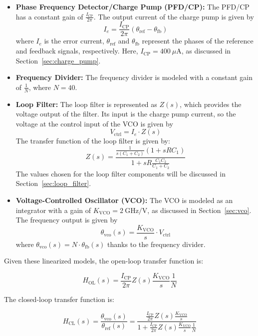 \documentclass[lettersize,journal]{IEEEtran}
\begin{document}
\begin{itemize}
    \item \textbf{Phase Frequency Detector/Charge Pump (PFD/CP):} The PFD/CP has a constant gain of \( \frac{I_{\text{CP}}}{2\pi} \). The output current of the charge pump is given by 
    \[ 
    I_e = \frac{I_{\text{CP}}}{2\pi} \left( \theta_{\text{ref}} - \theta_{\text{fb}} \right)
    \] 
    where \(I_e\) is the error current, \( \theta_{\text{ref}} \) and \( \theta_{\text{fb}} \) represent the phases of the reference and feedback signals, respectively. Here, \( I_{\text{CP}} = 400~\mu\mathrm{A} \), as discussed in Section~\ref{sec:charge_pump}.
    
    \item \textbf{Frequency Divider:} The frequency divider is modeled with a constant gain of \( \frac{1}{N} \), where \( N = 40 \).
    
    \item \textbf{Loop Filter:} The loop filter is represented as \( Z(s) \), which provides the voltage output of the filter. Its input is the charge pump current, so the voltage at the control input of the VCO is given by 
    \[ 
    V_{\text{ctrl}} = I_e \cdot Z(s) 
    \] 
    The transfer function of the loop filter is given by:
    \[
    Z(s) = \frac{\frac{1}{s(C_1 + C_2)} \left(1 + sRC_1\right)}{1 + sR\frac{C_1C_2}{C_1 + C_2}}
    \]
    The values chosen for the loop filter components will be discussed in Section~\ref{sec:loop_filter}.
    
    \item \textbf{Voltage-Controlled Oscillator (VCO):} The VCO is modeled as an integrator with a gain of \( K_{\text{VCO}} = 2~\mathrm{GHz/V} \), as discussed in Section~\ref{sec:vco}. The frequency output is given by 
    \[ 
    \theta_{\text{vco}}(s) = \frac{K_{\text{VCO}}}{s} \cdot V_{\text{ctrl}} 
    \]
    where \(\theta_{\text{vco}}(s) = N \cdot \theta_{\text{fb}}(s)\) thanks to the frequency divider.
\end{itemize}

Given these linearized models, the open-loop transfer function is:

\begin{equation}
    H_{\text{OL}}(s) =\frac{I_{\text{CP}}}{2\pi} Z(s) \frac{K_{\text{VCO}}}{s} \frac{1}{N}
\end{equation}

The closed-loop transfer function is:

\begin{equation}
    H_{\text{CL}}(s) = \frac{\theta_{\text{vco}}(s)}{\theta_{\text{ref}}(s)} =  \frac{\frac{I_{\text{CP}}}{2\pi} Z(s) \frac{K_{\text{VCO}}}{s}}{1 + \frac{I_{\text{CP}}}{2\pi} Z(s) \frac{K_{\text{VCO}}}{s} \frac{1}{N}}
\end{equation}
\end{document}
